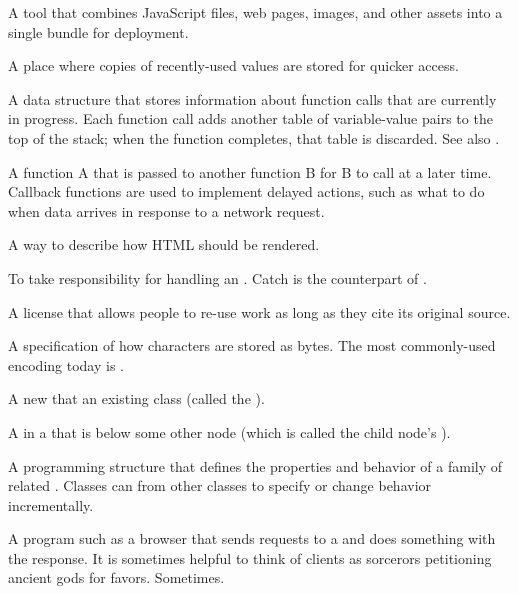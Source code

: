 \begin{description}
A tool that combines JavaScript files, web pages, images, and other assets
into a single bundle for deployment.

A place where copies of recently-used values are stored for quicker access.

A data structure that stores information about function calls that are
currently in progress. Each function call adds another table of
variable-value pairs to the top of the stack; when the function completes,
that table is discarded. See also .

A function A that is passed to another function B for B to call at a later
time. Callback functions are used to implement delayed actions, such as what
to do when data arrives in response to a network request.

A way to describe how HTML should be rendered.

To take responsibility for handling an .
Catch is the counterpart of .

A license that allows people to re-use work as long as they cite its
original source.

A specification of how characters are stored as bytes. The most commonly-used
encoding today is .

A new  that  an existing class (called
the ).

A  in a  that is below some other node (which is
called the child node's ).

A programming structure that defines the properties and behavior of a family
of related . Classes can  from other
classes to specify or change behavior incrementally.

A program such as a browser that sends requests to a  and
does something with the response. It is sometimes helpful to think of clients
as sorcerors petitioning ancient gods for favors. Sometimes.


\end{description}

